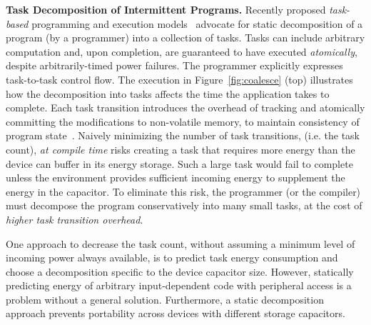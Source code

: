 \textbf{Task Decomposition of Intermittent Programs.} Recently proposed {\em
task-based} programming and execution models~\cite{alpaca,chain} advocate for
static decomposition of a program (by a programmer) into a collection of tasks.
Tasks can include arbitrary computation and, upon completion, are guaranteed to
have executed {\em atomically}, despite arbitrarily-timed power failures.
The programmer explicitly expresses task-to-task control flow. The execution
in Figure~\ref{fig:coalesce} (top) illustrates how the decomposition into
tasks affects the time the application takes to complete. Each task transition introduces the overhead of tracking and atomically committing the modifications to non-volatile memory, to maintain consistency of program state~\cite{chain,alpaca}. Naively minimizing the number of task transitions, (i.e. the task count), \emph{at compile time} risks creating a task that requires more energy than the device can buffer in its energy storage. Such a large task would fail to complete unless the environment provides sufficient incoming energy to supplement the energy in the capacitor. To eliminate this risk, the programmer (or the compiler) must decompose the program conservatively into many small tasks, at the cost of \emph{higher task transition overhead}.

One approach to decrease the task count, without assuming a minimum level of
incoming power always available, is to predict task energy consumption and
choose a decomposition specific to the device capacitor size. However, statically predicting energy of arbitrary input-dependent code with peripheral access is a problem without a general solution. Furthermore, a static decomposition approach prevents portability across devices with different storage capacitors.


